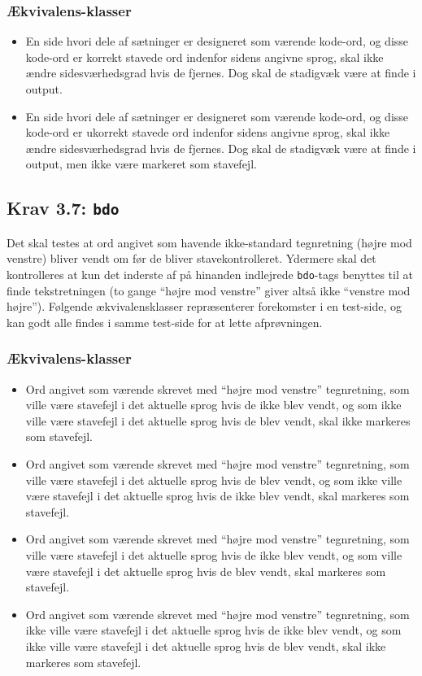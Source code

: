 \documentclass[a4paper,oneside,article]{memoir}
\begin{document}
\begin{landscape}
\subsubsection{Ækvivalens-klasser}
\begin{itemize}
\item En side hvori dele af sætninger er designeret som værende
  kode-ord, og disse kode-ord er korrekt stavede ord indenfor sidens
  angivne sprog, skal ikke ændre sidesværhedsgrad hvis de fjernes. Dog
  skal de stadigvæk være at finde i output.
\item En side hvori dele af sætninger er designeret som værende
  kode-ord, og disse kode-ord er ukorrekt stavede ord indenfor sidens
  angivne sprog, skal ikke ændre sidesværhedsgrad hvis de fjernes. Dog
  skal de stadigvæk være at finde i output, men ikke være markeret som
  stavefejl.
\end{itemize}

\subsection{Krav 3.7: \texttt{bdo}}

Det skal testes at ord angivet som havende ikke-standard tegnretning
(højre mod venstre) bliver vendt om før de bliver
stavekontrolleret. Ydermere skal det kontrolleres at kun det inderste
af på hinanden indlejrede \texttt{bdo}-tags benyttes til at finde
tekstretningen (to gange ``højre mod venstre'' giver altså ikke
``venstre mod højre''). Følgende ækvivalensklasser repræsenterer
forekomster i en test-side, og kan godt alle findes i samme test-side
for at lette afprøvningen.

\subsubsection{Ækvivalens-klasser}
\begin{itemize}
\item Ord angivet som værende skrevet med ``højre mod venstre''
  tegnretning, som ville være stavefejl i det aktuelle sprog hvis de
  ikke blev vendt, og som ikke ville være stavefejl i det aktuelle
  sprog hvis de blev vendt, skal ikke markeres som stavefejl.
\item Ord angivet som værende skrevet med ``højre mod venstre''
  tegnretning, som ville være stavefejl i det aktuelle sprog hvis de
  blev vendt, og som ikke ville være stavefejl i det aktuelle sprog
  hvis de ikke blev vendt, skal markeres som stavefejl.
\item Ord angivet som værende skrevet med ``højre mod venstre''
  tegnretning, som ville være stavefejl i det aktuelle sprog hvis de
  ikke blev vendt, og som ville være stavefejl i det aktuelle sprog
  hvis de blev vendt, skal markeres som stavefejl.
\item Ord angivet som værende skrevet med ``højre mod venstre''
  tegnretning, som ikke ville være stavefejl i det aktuelle sprog hvis
  de ikke blev vendt, og som ikke ville være stavefejl i det aktuelle
  sprog hvis de blev vendt, skal ikke markeres som stavefejl.
\end{itemize}


\end{landscape}
\end{document}
